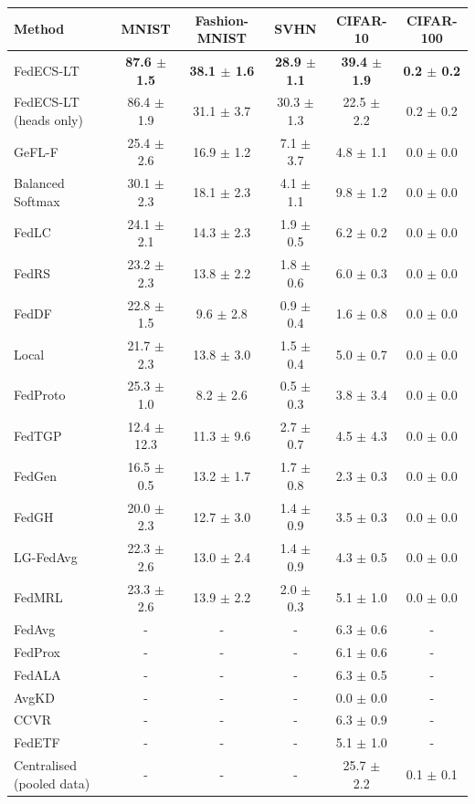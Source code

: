 \begin{tabular}{lccccc}
\toprule
Method & MNIST & Fashion-MNIST & SVHN & CIFAR-10 & CIFAR-100\\
\midrule
FedECS-LT & \textbf{87.6 $\pm$ 1.5} & \textbf{38.1 $\pm$ 1.6} & \textbf{28.9 $\pm$ 1.1} & \textbf{39.4 $\pm$ 1.9} & \textbf{0.2 $\pm$ 0.2}\\
FedECS-LT (heads only) & 86.4 $\pm$ 1.9 & 31.1 $\pm$ 3.7 & 30.3 $\pm$ 1.3 & 22.5 $\pm$ 2.2 & 0.2 $\pm$ 0.2\\
GeFL-F & 25.4 $\pm$ 2.6 & 16.9 $\pm$ 1.2 & 7.1 $\pm$ 3.7 & 4.8 $\pm$ 1.1 & 0.0 $\pm$ 0.0\\
Balanced Softmax & 30.1 $\pm$ 2.3 & 18.1 $\pm$ 2.3 & 4.1 $\pm$ 1.1 & 9.8 $\pm$ 1.2 & 0.0 $\pm$ 0.0\\
FedLC & 24.1 $\pm$ 2.1 & 14.3 $\pm$ 2.3 & 1.9 $\pm$ 0.5 & 6.2 $\pm$ 0.2 & 0.0 $\pm$ 0.0\\
FedRS & 23.2 $\pm$ 2.3 & 13.8 $\pm$ 2.2 & 1.8 $\pm$ 0.6 & 6.0 $\pm$ 0.3 & 0.0 $\pm$ 0.0\\
FedDF & 22.8 $\pm$ 1.5 & 9.6 $\pm$ 2.8 & 0.9 $\pm$ 0.4 & 1.6 $\pm$ 0.8 & 0.0 $\pm$ 0.0\\
Local & 21.7 $\pm$ 2.3 & 13.8 $\pm$ 3.0 & 1.5 $\pm$ 0.4 & 5.0 $\pm$ 0.7 & 0.0 $\pm$ 0.0\\
FedProto & 25.3 $\pm$ 1.0 & 8.2 $\pm$ 2.6 & 0.5 $\pm$ 0.3 & 3.8 $\pm$ 3.4 & 0.0 $\pm$ 0.0\\
FedTGP & 12.4 $\pm$ 12.3 & 11.3 $\pm$ 9.6 & 2.7 $\pm$ 0.7 & 4.5 $\pm$ 4.3 & 0.0 $\pm$ 0.0\\
FedGen & 16.5 $\pm$ 0.5 & 13.2 $\pm$ 1.7 & 1.7 $\pm$ 0.8 & 2.3 $\pm$ 0.3 & 0.0 $\pm$ 0.0\\
FedGH & 20.0 $\pm$ 2.3 & 12.7 $\pm$ 3.0 & 1.4 $\pm$ 0.9 & 3.5 $\pm$ 0.3 & 0.0 $\pm$ 0.0\\
LG-FedAvg & 22.3 $\pm$ 2.6 & 13.0 $\pm$ 2.4 & 1.4 $\pm$ 0.9 & 4.3 $\pm$ 0.5 & 0.0 $\pm$ 0.0\\
FedMRL & 23.3 $\pm$ 2.6 & 13.9 $\pm$ 2.2 & 2.0 $\pm$ 0.3 & 5.1 $\pm$ 1.0 & 0.0 $\pm$ 0.0\\
FedAvg & - & - & - & 6.3 $\pm$ 0.6 & -\\
FedProx & - & - & - & 6.1 $\pm$ 0.6 & -\\
FedALA & - & - & - & 6.3 $\pm$ 0.5 & -\\
AvgKD & - & - & - & 0.0 $\pm$ 0.0 & -\\
CCVR & - & - & - & 6.3 $\pm$ 0.9 & -\\
FedETF & - & - & - & 5.1 $\pm$ 1.0 & -\\
Centralised (pooled data) & - & - & - & 25.7 $\pm$ 2.2 & 0.1 $\pm$ 0.1\\
\bottomrule
\end{tabular}
